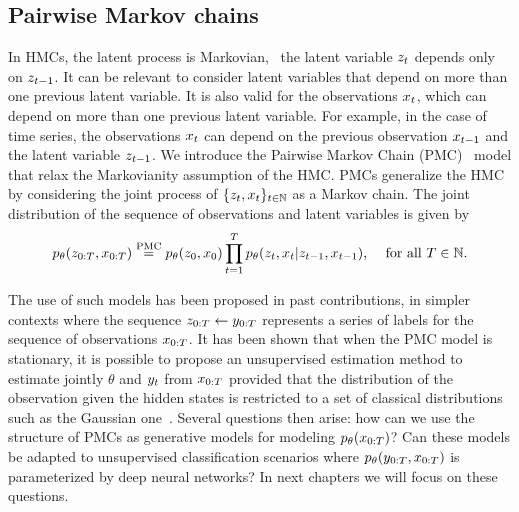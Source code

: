 \subsection{Pairwise Markov chains}
\label{sec:pairwise_triplet_mc}
In HMCs, the latent process is Markovian, \ie~the latent
variable $z_t$ depends only on $z_{t-1}$. It can be relevant to consider
latent variables that depend on more than one previous latent variable.
It is also valid for the observations $x_{t}$, which can depend on more than
one previous latent variable.
For example, in the case of time series, the observations $x_{t}$ can depend
on the previous observation $x_{t-1}$ and the latent variable $z_{t-1}$.
We introduce the Pairwise Markov Chain (PMC)~\citep{pieczynski2003pairwise,
derrode2004signal, le2008fuzzy} model that relax the 
Markovianity assumption of the HMC. 
PMCs generalize the HMC
by considering the joint process of $\{z_t, x_{t}\}_{t\in \mathbb{N}}$
as a Markov chain.
The joint distribution of the sequence of observations and latent variables
is given by
\begin{equation}
    \label{eq:pmc_intro}
    p_{\theta}(z_{0:T}, x_{0:T} ) \overset{\text{PMC}}{=} 
    p_{\theta}(z_0, x_0) \prod_{t=1}^{T}  p_{\theta}(z_{t}, x_{t}|z_{t-1}, x_{t-1})
    \text{,} \quad \text{ for all } T \in \mathbb{N}  \text{.}
\end{equation}

The use of such models has been proposed
in past contributions, in simpler contexts where the sequence $z_{0:T}
\leftarrow y_{0:T}$ represents a series
of labels for the sequence of observations $x_{0:T}$. 
It has been shown that when the PMC model
is stationary, it is possible to propose an unsupervised estimation 
method to estimate jointly  $\theta$ and $y_t$ from $x_{0:T}$ provided
that the distribution of the observation given the hidden 
states is restricted to a set of classical distributions
such as the Gaussian one~\citep{gorynin2018assessing}.
Several questions then arise: how can we use the structure of PMCs
as generative models for modeling $p_{\theta}(x_{0:T})$?
Can these models be adapted to unsupervised classification
scenarios where $p_{\theta}(y_{0:T}, x_{0:T})$ is parameterized by deep neural networks?
In next chapters we will focus on these questions.

